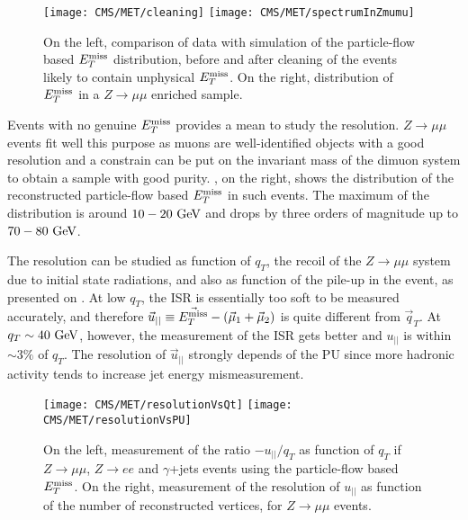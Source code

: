         \begin{figure}[h!]
            \centering
            \texttt{[image: CMS/MET/cleaning]}
            \texttt{[image: CMS/MET/spectrumInZmumu]}
            \caption{On the left, comparison of data with simulation of the
            particle-flow based $E_T^\text{miss}$ distribution, before and after cleaning of the events
            likely to contain unphysical $E_T^\text{miss}$. On the right, distribution of $E_T^\text{miss}$ in
            a $Z \rightarrow \mu\mu$ enriched sample.}
            \label{fig:METspectrum}
        \end{figure}

        Events with no genuine $E_T^\text{miss}$ provides a mean to study the resolution.
        $Z \rightarrow \mu\mu$ events fit well this purpose as muons are well-identified objects
        with a good resolution and a constrain can be put on the invariant mass of the
        dimuon system to obtain a sample with good purity. ,
        on the right, shows the distribution of the reconstructed particle-flow based
        $E_T^\text{miss}$ in such events. The maximum of the distribution is around $10-20~\text{GeV}$ and
        drops by three orders of magnitude up to $70-80~\text{GeV}$.

        The resolution can be studied as function of $q_T$, the recoil of the $Z \rightarrow \mu\mu$
        system due to initial state radiations, and also as function of the pile-up in the
        event, as presented on . At low $q_T$, the ISR is
        essentially too soft to be measured accurately, and therefore $\vec{u}_{||}
        \equiv \vec{E_T^\text{miss}} - (\vec{\mu}_1 + \vec{\mu}_2)$ is quite different from $\vec{q}_T$.
        At $q_T \sim 40~\text{GeV}$, however, the measurement of the ISR gets better and $u_{||}$
        is within $\sim 3\%$ of $q_T$. The resolution of $\vec{u}_{||}$ strongly depends
        of the PU since more hadronic activity tends to increase jet energy mismeasurement.

        \begin{figure}[h!]
            \centering
            \texttt{[image: CMS/MET/resolutionVsQt]}
            \texttt{[image: CMS/MET/resolutionVsPU]}
            \caption{On the left, measurement of the ratio $-u_{||}/q_T$ as function of $q_T$
            if $Z\rightarrow\mu\mu$, $Z\rightarrow e e$ and $\gamma$+jets events using
            the particle-flow based $E_T^\text{miss}$. On the right, measurement of the resolution of
            $u_{||}$ as function of the number of reconstructed vertices, for
            $Z\rightarrow\mu\mu$ events.}
            \label{fig:METresolution}
        \end{figure}


